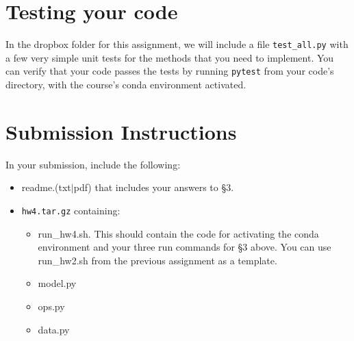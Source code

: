\documentclass[11pt]{article}
\begin{document}
\section{Testing your code}

In the dropbox folder for this assignment, we will include a file \texttt{test\_all.py} with a few very simple unit tests for the methods that you need to implement.  You can verify that your code passes the tests by running \texttt{pytest} from your code's directory, with the course's conda environment activated.


\section*{Submission Instructions}

In your submission, include the following:
\begin{itemize}
  \item readme.(txt$\mid$pdf) that includes your answers to \S3. 
  \item \texttt{hw4.tar.gz} containing:
  \begin{itemize}
    \item run\_hw4.sh.  This should contain the code for activating the conda environment and your three run commands for \S3 above.  You can use run\_hw2.sh from the previous assignment as a template.
    \item model.py
    \item ops.py
    \item data.py
  \end{itemize}
\end{itemize}
\end{document}
